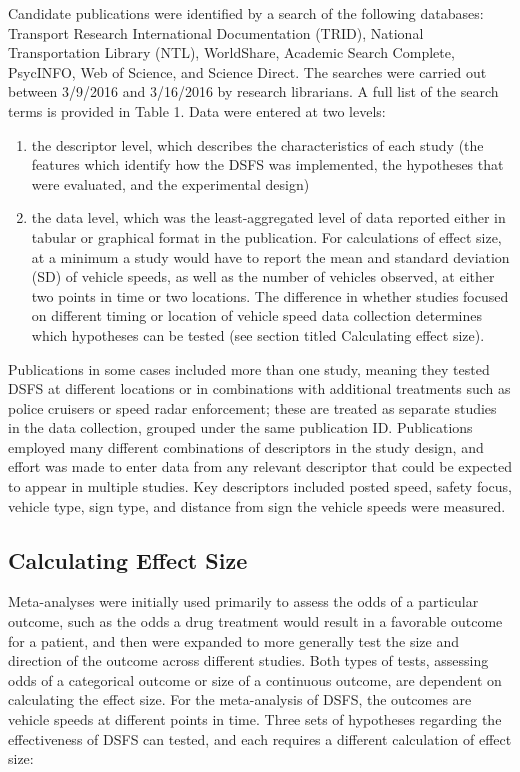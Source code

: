 \documentclass[]{article}
\providecommand{\tightlist}{%
  \setlength{\itemsep}{0pt}\setlength{\parskip}{0pt}}
\begin{document}
Candidate publications were identified by a search of the following
databases: Transport Research International Documentation (TRID),
National Transportation Library (NTL), WorldShare, Academic Search
Complete, PsycINFO, Web of Science, and Science Direct. The searches
were carried out between 3/9/2016 and 3/16/2016 by research librarians.
A full list of the search terms is provided in Table 1. Data were
entered at two levels:

\begin{enumerate}
\def\labelenumi{(\alph{enumi})}
\tightlist
\item
  the descriptor level, which describes the characteristics of each
  study (the features which identify how the DSFS was implemented, the
  hypotheses that were evaluated, and the experimental design)
\item
  the data level, which was the least-aggregated level of data reported
  either in tabular or graphical format in the publication. For
  calculations of effect size, at a minimum a study would have to report
  the mean and standard deviation (SD) of vehicle speeds, as well as the
  number of vehicles observed, at either two points in time or two
  locations. The difference in whether studies focused on different
  timing or location of vehicle speed data collection determines which
  hypotheses can be tested (see section titled Calculating effect size).
\end{enumerate}

Publications in some cases included more than one study, meaning they
tested DSFS at different locations or in combinations with additional
treatments such as police cruisers or speed radar enforcement; these are
treated as separate studies in the data collection, grouped under the
same publication ID. Publications employed many different combinations
of descriptors in the study design, and effort was made to enter data
from any relevant descriptor that could be expected to appear in
multiple studies. Key descriptors included posted speed, safety focus,
vehicle type, sign type, and distance from sign the vehicle speeds were
measured.

\subsection{Calculating Effect Size}\label{calculating-effect-size}

Meta-analyses were initially used primarily to assess the odds of a
particular outcome, such as the odds a drug treatment would result in a
favorable outcome for a patient, and then were expanded to more
generally test the size and direction of the outcome across different
studies. Both types of tests, assessing odds of a categorical outcome or
size of a continuous outcome, are dependent on calculating the effect
size. For the meta-analysis of DSFS, the outcomes are vehicle speeds at
different points in time. Three sets of hypotheses regarding the
effectiveness of DSFS can tested, and each requires a different
calculation of effect size:
\end{document}

